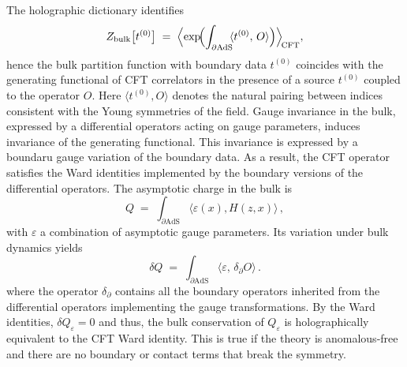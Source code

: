 \documentclass[a4paper,12pt]{article}
\begin{document}
The holographic dictionary identifies
\begin{equation}
  Z_{\text{bulk}}\bigl[t^{(0)}\bigr]
  \;=\; \Bigl\langle \exp\!\Bigl(\int_{\partial \mathrm{AdS}} \!\!\langle t^{(0)}, \, O \rangle \Bigr) \Bigr\rangle_{\!\text{CFT}},
\end{equation}
hence the bulk partition function with boundary data $t^{(0)}$ coincides with the generating functional of CFT correlators in the presence of a source $t^{(0)}$ coupled to the operator $O$. Here $\langle t^{(0)}, O \rangle$ denotes the natural pairing between indices consistent with the Young symmetries of the field. Gauge invariance in the bulk, expressed by a differential operators acting on gauge parameters, induces invariance of the generating functional. This invariance is expressed by a boundaru gauge variation of the boundary data. As a result, the CFT operator satisfies the Ward identities implemented by the boundary versions of the differential operators. The asymptotic charge in the bulk is
\begin{equation}
  Q\;=\; \int_{\partial \mathrm{AdS}} \!\langle \varepsilon (x), H(z,x) \rangle \, ,
\end{equation}
with $\varepsilon$ a combination of asymptotic gauge parameters. Its variation under bulk dynamics yields
\begin{equation}
  \delta Q \;=\; \int_{\partial \mathrm{AdS}} \!\langle \varepsilon , \, \delta_{\partial} O \rangle \, .
\end{equation}
where the operator $\delta_\partial$ contains all the boundary operators inherited from the differential operators implementing the gauge transformations. 
By the Ward identities, $\delta Q_{\varepsilon}=0$ and thus, the bulk conservation of $Q_{\varepsilon}$ is holographically equivalent to the CFT Ward identity. This is true if the theory is anomalous-free and there are no boundary or contact terms that break the symmetry.
\end{document}
